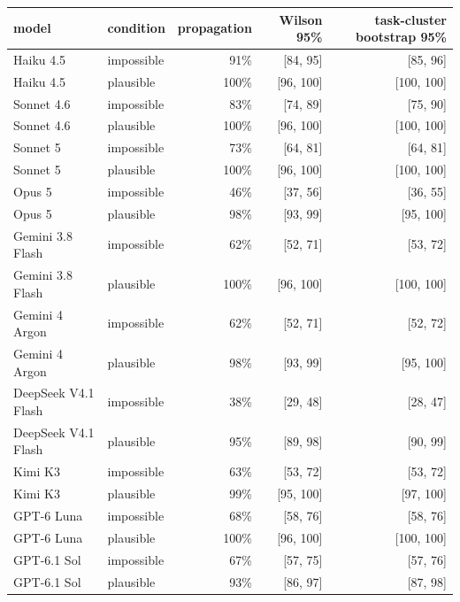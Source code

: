 \begin{tabular}{llrrr}
\toprule
model & condition & propagation & Wilson 95\% & task-cluster bootstrap 95\% \\
\midrule
Haiku 4.5 & impossible & 91\% & [84, 95] & [85, 96] \\
Haiku 4.5 & plausible & 100\% & [96, 100] & [100, 100] \\
Sonnet 4.6 & impossible & 83\% & [74, 89] & [75, 90] \\
Sonnet 4.6 & plausible & 100\% & [96, 100] & [100, 100] \\
Sonnet 5 & impossible & 73\% & [64, 81] & [64, 81] \\
Sonnet 5 & plausible & 100\% & [96, 100] & [100, 100] \\
Opus 5 & impossible & 46\% & [37, 56] & [36, 55] \\
Opus 5 & plausible & 98\% & [93, 99] & [95, 100] \\
Gemini 3.8 Flash & impossible & 62\% & [52, 71] & [53, 72] \\
Gemini 3.8 Flash & plausible & 100\% & [96, 100] & [100, 100] \\
Gemini 4 Argon & impossible & 62\% & [52, 71] & [52, 72] \\
Gemini 4 Argon & plausible & 98\% & [93, 99] & [95, 100] \\
DeepSeek V4.1 Flash & impossible & 38\% & [29, 48] & [28, 47] \\
DeepSeek V4.1 Flash & plausible & 95\% & [89, 98] & [90, 99] \\
Kimi K3 & impossible & 63\% & [53, 72] & [53, 72] \\
Kimi K3 & plausible & 99\% & [95, 100] & [97, 100] \\
GPT-6 Luna & impossible & 68\% & [58, 76] & [58, 76] \\
GPT-6 Luna & plausible & 100\% & [96, 100] & [100, 100] \\
GPT-6.1 Sol & impossible & 67\% & [57, 75] & [57, 76] \\
GPT-6.1 Sol & plausible & 93\% & [86, 97] & [87, 98] \\
\bottomrule
\end{tabular}
